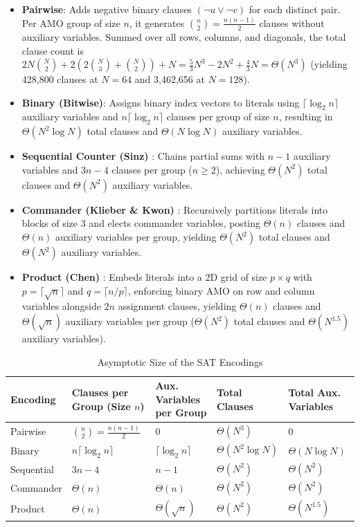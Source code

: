 \documentclass[a4paper,fleqn]{cas-sc}
\begin{document}
\begin{itemize}
    \item \textbf{Pairwise}: Adds negative binary clauses $(\neg u \lor \neg v)$ for each distinct pair. Per AMO group of size $n$, it generates $\binom{n}{2} = \frac{n(n-1)}{2}$ clauses without auxiliary variables. Summed over all rows, columns, and diagonals, the total clause count is $2N\binom{N}{2} + 2\left(2\binom{N}{3} + \binom{N}{2}\right) + N = \frac{5}{3}N^3 - 2N^2 + \frac{4}{3}N = \Theta(N^3)$ (yielding 428,800 clauses at $N = 64$ and 3,462,656 at $N = 128$).
    \item \textbf{Binary (Bitwise)}: Assigns binary index vectors to literals using $\lceil \log_2 n \rceil$ auxiliary variables and $n \lceil \log_2 n \rceil$ clauses per group of size $n$, resulting in $\Theta(N^2 \log N)$ total clauses and $\Theta(N \log N)$ auxiliary variables.
    \item \textbf{Sequential Counter (Sinz)} \citep{sinz2005}: Chains partial sums with $n - 1$ auxiliary variables and $3n - 4$ clauses per group ($n \ge 2$), achieving $\Theta(N^2)$ total clauses and $\Theta(N^2)$ auxiliary variables.
    \item \textbf{Commander (Klieber \& Kwon)} \citep{klieber2007efficient}: Recursively partitions literals into blocks of size 3 and elects commander variables, posting $\Theta(n)$ clauses and $\Theta(n)$ auxiliary variables per group, yielding $\Theta(N^2)$ total clauses and $\Theta(N^2)$ auxiliary variables.
    \item \textbf{Product (Chen)} \citep{chen2010new}: Embeds literals into a 2D grid of size $p \times q$ with $p = \lceil \sqrt{n} \rceil$ and $q = \lceil n/p \rceil$, enforcing binary AMO on row and column variables alongside $2n$ assignment clauses, yielding $\Theta(n)$ clauses and $\Theta(\sqrt{n})$ auxiliary variables per group ($\Theta(N^2)$ total clauses and $\Theta(N^{1.5})$ auxiliary variables).
\end{itemize}

\begin{table}[htbp]
\centering
\caption{Asymptotic Size of the SAT Encodings} \label{tab:sat_encodings_complexity}
\begin{tabular}{lllll}
\toprule
Encoding & Clauses per Group (Size $n$) & Aux. Variables per Group & Total Clauses & Total Aux. Variables \\
\midrule
Pairwise & $\binom{n}{2} = \frac{n(n-1)}{2}$ & $0$ & $\Theta(N^3)$ & $0$ \\
Binary & $n \lceil \log_2 n \rceil$ & $\lceil \log_2 n \rceil$ & $\Theta(N^2 \log N)$ & $\Theta(N \log N)$ \\
Sequential & $3n - 4$ & $n - 1$ & $\Theta(N^2)$ & $\Theta(N^2)$ \\
Commander & $\Theta(n)$ & $\Theta(n)$ & $\Theta(N^2)$ & $\Theta(N^2)$ \\
Product & $\Theta(n)$ & $\Theta(\sqrt{n})$ & $\Theta(N^2)$ & $\Theta(N^{1.5})$ \\
\bottomrule
\end{tabular}
\end{table}
\end{document}
